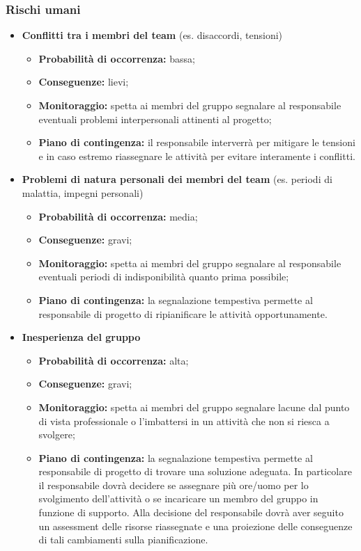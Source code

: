 	\subsubsection{Rischi umani}
		\begin{itemize}
			\item \textbf{Conflitti tra i membri del team} (es. disaccordi, tensioni)
				\begin{itemize}
					\item \textbf{Probabilità di occorrenza:} bassa;
					\item \textbf{Conseguenze:} lievi;
					\item \textbf{Monitoraggio:} spetta ai membri del gruppo segnalare al responsabile eventuali problemi interpersonali attinenti al progetto;
					\item \textbf{Piano di contingenza:} il responsabile interverrà per mitigare le tensioni e in caso estremo riassegnare le attività per evitare interamente i conflitti.
				\end{itemize}
			\item \textbf{Problemi di natura personali dei membri del team} (es. periodi di malattia, impegni personali)
				\begin{itemize}
					\item \textbf{Probabilità di occorrenza:} media;
					\item \textbf{Conseguenze:} gravi;
					\item \textbf{Monitoraggio:} spetta ai membri del gruppo segnalare al responsabile eventuali periodi di indisponibilità quanto prima possibile;
					\item \textbf{Piano di contingenza:} la segnalazione tempestiva permette al responsabile di progetto di ripianificare le attività opportunamente.
				\end{itemize}
			\item \textbf{Inesperienza del gruppo}
				\begin{itemize}
					\item \textbf{Probabilità di occorrenza:} alta;
					\item \textbf{Conseguenze:} gravi;
					\item \textbf{Monitoraggio:} spetta ai membri del gruppo segnalare lacune dal punto di vista professionale o l'imbattersi in un attività che non si riesca a svolgere;
					\item \textbf{Piano di contingenza:} la segnalazione tempestiva permette al responsabile di progetto di trovare una soluzione adeguata. In particolare il responsabile dovrà decidere se assegnare più ore/uomo per lo svolgimento dell'attività o se incaricare un membro del gruppo in funzione di supporto. Alla decisione del responsabile dovrà aver seguito un assessment delle risorse riassegnate e una proiezione delle conseguenze di tali cambiamenti sulla pianificazione.
				\end{itemize}
		\end{itemize}
